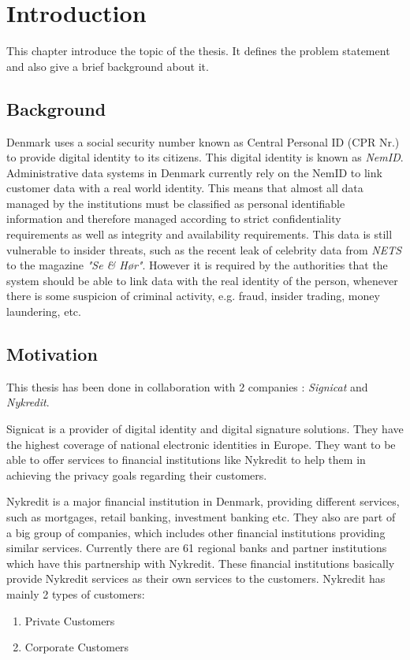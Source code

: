 \chapter{Introduction}

This chapter introduce the topic of the thesis. It defines the problem statement and also give a brief background about it.
\section{Background}
Denmark uses a social security number known as Central Personal ID (CPR Nr.) to provide digital identity to its citizens. This digital identity is known as \textit{NemID}\cite{1_nemid_nu_2015}. Administrative data systems in Denmark currently rely on the NemID to link customer data with a real world identity. This means that almost all data managed by the institutions must be classified as personal identifiable information and therefore managed according to strict confidentiality requirements as well as integrity and availability requirements. This data is still vulnerable to insider threats, such as the recent leak of celebrity data from \textit{NETS} to the magazine \textit{"Se \& Hør"}\cite{2_duchlangpap_2014}. However it is required by the authorities that the system should be able to link data with the real identity of the person, whenever there is some suspicion of criminal activity, e.g. fraud, insider trading, money laundering, etc.
\section{Motivation}
This thesis has been done in collaboration with 2 companies : \textit{Signicat}\cite{3_signicat_2015} and \textit{Nykredit}\cite{4_nykredit_dk_2015}.

Signicat is a provider of digital identity and digital signature solutions. They have the highest coverage of national electronic identities in Europe. They want to be able to offer services to financial institutions like Nykredit to help them in achieving the privacy goals regarding their customers.

Nykredit is a major financial institution in Denmark, providing different services, such as mortgages, retail banking, investment banking etc. They also are part of a big group of companies, which includes other financial institutions providing similar services. Currently there are 61 regional banks and partner institutions which have this partnership with Nykredit. These financial institutions basically provide Nykredit services as their own services to the customers.
Nykredit has mainly 2 types of customers:
\begin{enumerate}
\item Private Customers
\item Corporate Customers
\end{enumerate}
